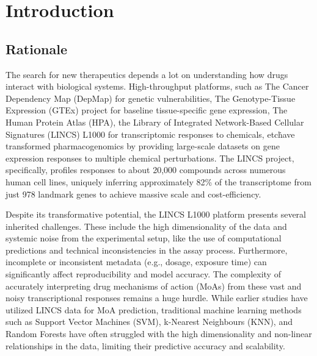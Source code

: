 \documentclass[twocolumn]{article}
\begin{document}
\twocolumn
\section{Introduction}
\subsection{Rationale}
The search for new therapeutics depends a lot on understanding how drugs interact with biological systems. High-throughput platforms, such as The Cancer Dependency Map (DepMap) for genetic vulnerabilities, The Genotype-Tissue Expression (GTEx) project for baseline tissue-specific gene expression, The Human Protein Atlas (HPA), the Library of Integrated Network-Based Cellular Signatures (LINCS) L1000 for transcriptomic responses to chemicals, etc\. have transformed pharmacogenomics by providing large-scale datasets on gene expression responses to multiple chemical perturbations. The LINCS project, specifically, profiles responses to about 20,000 compounds across numerous human cell lines, uniquely inferring approximately 82\% of the transcriptome from just 978 landmark genes to achieve massive scale and cost-efficiency\cite{subramanian2017next,mcdermott2019deep}.

Despite its transformative potential, the LINCS L1000 platform presents several inherited challenges. These include the high dimensionality of the data and systemic noise from the experimental setup, like the use of computational predictions and technical inconsistencies in the assay process. Furthermore, incomplete or inconsistent metadata (e.g., dosage, exposure time) can significantly affect reproducibility and model accuracy\cite{stathias2018sustainable}. The complexity of accurately interpreting drug mechanisms of action (MoAs) from these vast and noisy transcriptional responses remains a huge hurdle. While earlier studies have utilized LINCS data for MoA prediction\cite{everett2023combining,gao2022deep,el2017integrative,wang2016drug,subramanian2017next,wu2022deep,liao2023open}, traditional machine learning methods such as Support Vector Machines (SVM), k-Nearest Neighbours (KNN), and Random Forests have often struggled with the high dimensionality and non-linear relationships in the data, limiting their predictive accuracy and scalability\cite{li2020deep,everett2023combining}.
\end{document}
